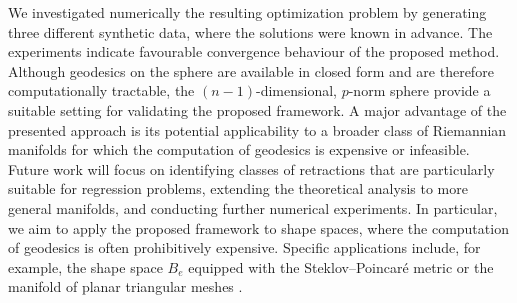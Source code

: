 \documentclass[11pt,a4paper]{article}
\theoremstyle{plain}
\theoremstyle{definition}
\begin{document}
We investigated numerically the resulting optimization problem by generating three different synthetic data, where the solutions were known in advance. The experiments indicate favourable convergence behaviour of the proposed method. Although geodesics on the sphere are available in closed form and are therefore computationally tractable, the $(n-1)$-dimensional, $p$-norm sphere provide a suitable setting for validating the proposed framework. A major advantage of the presented approach is its potential applicability to a broader class of Riemannian manifolds for which the computation of geodesics is expensive or infeasible. Future work will focus on identifying classes of retractions that are particularly suitable for regression problems, extending the theoretical analysis to more general manifolds, and conducting further numerical experiments. In particular, we aim to apply the proposed framework to shape spaces, where the computation of geodesics is often prohibitively expensive. Specific applications include, for example, the shape space $B_e$ equipped with the Steklov--Poincar\'e metric \cite{schulz2016} or the manifold of planar triangular meshes \cite{herzog2022a, herzog2024}.




\end{document}
